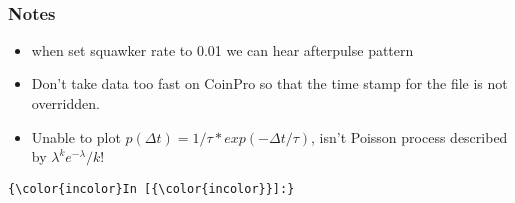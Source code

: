 \documentclass{article}
\begin{document}
    \begin{center}
    \end{center}
    { \hspace*{\fill} \\}
    

    \subsubsection{Notes}


    \begin{itemize}
\itemsep1pt\parskip0pt
\item
  when set squawker rate to 0.01 we can hear afterpulse pattern
\item
  Don't take data too fast on CoinPro so that the time stamp for the
  file is not overridden.
\item
  Unable to plot \(p(\Delta t) = 1/ \tau * exp(-\Delta t /\tau)\), isn't
  Poisson process described by \(\lambda^k e^{-\lambda}/k!\)
\end{itemize}

    \begin{Verbatim}[commandchars=\\\{\}]
{\color{incolor}In [{\color{incolor}}]:} 
\end{Verbatim}


    
    
    
    
\end{document}
